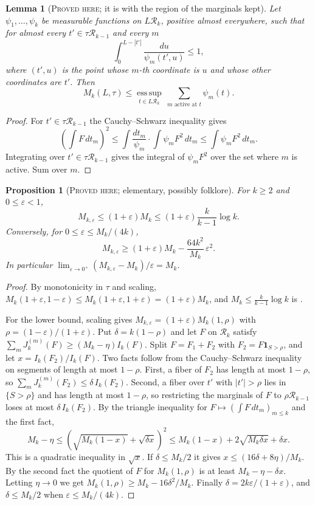 \documentclass[11pt]{amsart}
\newtheorem{proposition}[theorem]{Proposition}
\newtheorem{lemma}[theorem]{Lemma}
\theoremstyle{definition}
\theoremstyle{remark}
\newcommand{\lbl}[1]{\textup{\textsc{#1}}}
\newcommand{\R}{\mathcal{R}}
\begin{document}
\begin{lemma}[\lbl{Proved here}; it is {\cite[Lemma~6.1]{Pol14b}} with the region of the marginals kept]\label{lem:dual}
Let $\psi_1,\dots,\psi_k$ be measurable functions on $L\R_k$, positive almost
everywhere, such that for almost every $t'\in\tau\R_{k-1}$ and every $m$
\[
\int_0^{L-|t'|}\frac{du}{\psi_m(t',u)}\le1,
\]
where $(t',u)$ is the point whose $m$-th coordinate is $u$ and whose other
coordinates are $t'$. Then
\[
M_k(L,\tau)\le\operatorname*{ess\,sup}_{t\in L\R_k}\ \sum_{m\text{ active at }t}\psi_m(t).
\]
\end{lemma}

\begin{proof}
For $t'\in\tau\R_{k-1}$ the Cauchy--Schwarz inequality gives
\[
\left(\int F\,dt_m\right)^2\le\int\frac{dt_m}{\psi_m}\cdot\int\psi_mF^2\,dt_m\le\int\psi_mF^2\,dt_m .
\]
Integrating over $t'\in\tau\R_{k-1}$ gives the integral of $\psi_mF^2$ over
the set where $m$ is active. Sum over $m$.
\end{proof}

\begin{proposition}[\lbl{Proved here}; elementary, possibly folklore]\label{prop:eps-first}
For $k\ge2$ and $0\le\varepsilon<1$,
\[
M_{k,\varepsilon}\le(1+\varepsilon)M_k\le(1+\varepsilon)\frac{k}{k-1}\log k .
\]
Conversely, for $0\le\varepsilon\le M_k/(4k)$,
\[
M_{k,\varepsilon}\ge(1+\varepsilon)M_k-\frac{64k^2}{M_k}\,\varepsilon^2 .
\]
In particular $\lim_{\varepsilon\to0^+}(M_{k,\varepsilon}-M_k)/\varepsilon=M_k$.
\end{proposition}

\begin{proof}
By monotonicity in $\tau$ and scaling,
$M_k(1+\varepsilon,1-\varepsilon)\le M_k(1+\varepsilon,1+\varepsilon)=(1+\varepsilon)M_k$,
and $M_k\le\frac{k}{k-1}\log k$ is \cite[Cor.~6.4]{Pol14b}.

For the lower bound, scaling gives $M_{k,\varepsilon}=(1+\varepsilon)M_k(1,\rho)$
with $\rho=(1-\varepsilon)/(1+\varepsilon)$. Put $\delta=k(1-\rho)$ and let $F$
on $\R_k$ satisfy $\sum_mJ_k^{(m)}(F)\ge(M_k-\eta)I_k(F)$. Split $F=F_1+F_2$
with $F_2=F\mathbf 1_{S>\rho}$, and let $x=I_k(F_2)/I_k(F)$. Two facts follow
from the Cauchy--Schwarz inequality on segments of length at most $1-\rho$.
First, a fiber of $F_2$ has length at most $1-\rho$, so
$\sum_mJ_k^{(m)}(F_2)\le\delta\,I_k(F_2)$. Second, a fiber over $t'$ with
$|t'|>\rho$ lies in $\{S>\rho\}$ and has length at most $1-\rho$, so
restricting the marginals of $F$ to $\rho\R_{k-1}$ loses at most
$\delta\,I_k(F_2)$. By the triangle inequality for
$F\mapsto(\int F\,dt_m)_{m\le k}$ and the first fact,
\[
M_k-\eta\le\left(\sqrt{M_k(1-x)}+\sqrt{\delta x}\right)^2\le M_k(1-x)+2\sqrt{M_k\delta x}+\delta x .
\]
This is a quadratic inequality in $\sqrt x$. If $\delta\le M_k/2$ it gives
$x\le(16\delta+8\eta)/M_k$. By the second fact the quotient of $F$ for
$M_k(1,\rho)$ is at least $M_k-\eta-\delta x$. Letting $\eta\to0$ we get
$M_k(1,\rho)\ge M_k-16\delta^2/M_k$. Finally
$\delta=2k\varepsilon/(1+\varepsilon)$, and $\delta\le M_k/2$ when
$\varepsilon\le M_k/(4k)$.
\end{proof}
\end{document}
